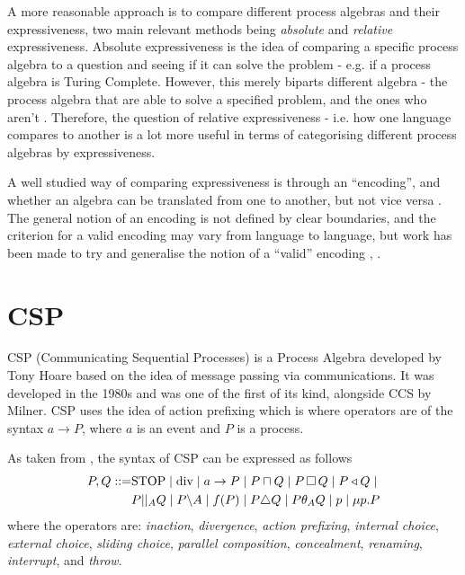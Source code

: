 \documentclass[logo,bsc,singlespacing,parskip,online]{infthesis}
\begin{document}
A more reasonable approach is to compare different process algebras and their expressiveness, two main relevant methods being \textit{absolute} and \textit{relative} expressiveness.\citep{parrowExpressivenessProcessAlgebras2008} Absolute expressiveness is the idea of comparing a specific process algebra to a question and seeing if it can solve the problem - e.g. if a process algebra is Turing Complete. However, this merely biparts different algebra - the process algebra that are able to solve a specified problem, and the ones who aren't \citep{gorlaUnifiedApproachEncodability2010}. Therefore, the question of relative expressiveness - i.e. how one language compares to another is a lot more useful in terms of categorising different process algebras by expressiveness.

A well studied way of comparing expressiveness is through an ``encoding'', and whether an algebra can be translated from one to another, but not vice versa \citep{petersComparingProcessCalculi2019}. The general notion of an encoding is not defined by clear boundaries, and the criterion for a valid encoding may vary from language to language, but work has been made to try and generalise the notion of a ``valid'' encoding \citep{gorlaUnifiedApproachEncodability2010}, \citep{DBLP:conf/fossacs/Glabbeek18}.

\section{CSP}
CSP (Communicating Sequential Processes) \citep{brookesTheoryCommunicatingSequential1984} is a Process Algebra developed by Tony Hoare based on the idea of message passing via communications. It was developed in the 1980s and was one of the first of its kind, alongside CCS by Milner. CSP uses the idea of action prefixing which is where operators are of the syntax $a \to P$, where $a$ is an event and $P$ is a process. 

As taken from \citet{vanglabbeekBranchingTimeModel2017}, the syntax of CSP can be expressed as follows
\begin{align*}
   P, Q ::= &\mathrm{STOP} \mid \mathrm{div} \mid a\to P \mid P \sqcap Q \mid P \,\square\, Q \mid P \triangleleft Q \mid \\
	&P | |_{A} Q \mid P \backslash A \mid f(P) \mid P \triangle Q \mid P \theta_{A} Q \mid p \mid \mu p.P
\end{align*}
where the operators are: \textit{inaction}, \textit{divergence}, \textit{action prefixing}, \textit{internal choice}, \textit{external choice}, \textit{sliding choice}, \textit{parallel composition}, \textit{concealment}, \textit{renaming}, \textit{interrupt}, and \textit{throw}.
\end{document}
